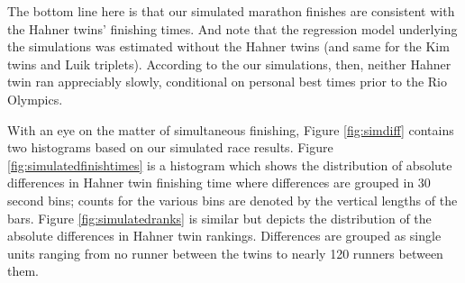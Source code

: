 \documentclass[12pt,titlepage]{article}
\begin{document}
The bottom line here is that our simulated marathon finishes are
consistent with the Hahner twins' finishing times.  And note that the
regression model underlying the simulations was estimated without the
Hahner twins (and same for the Kim twins and Luik triplets).
According to the our simulations, then, neither Hahner twin ran
appreciably slowly, conditional on personal best times prior to the
Rio Olympics.



With an eye on the matter of simultaneous finishing, Figure
\ref{fig:simdiff} contains two histograms based on our simulated race
results. Figure \ref{fig:simulatedfinishtimes} is a histogram which
shows the distribution of absolute differences in Hahner twin
finishing time where differences are grouped in 30 second bins; counts
for the various bins are denoted by the vertical lengths of the bars.
Figure \ref{fig:simulatedranks} is similar but depicts the
distribution of the absolute differences in Hahner twin rankings.
Differences are grouped as single units ranging from no runner between
the twins to nearly 120 runners between them.
\end{document}
